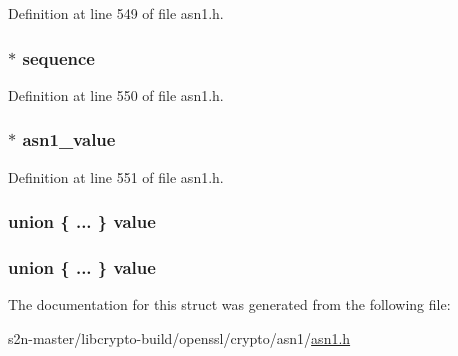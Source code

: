 Definition at line 549 of file asn1.\+h.

\subsubsection[{\texorpdfstring{sequence}{sequence}}]{$\ast$ sequence}\hypertarget{structasn1__type__st_ad6df88fe00a72b91394ae1b8b62d11ee}{}\label{structasn1__type__st_ad6df88fe00a72b91394ae1b8b62d11ee}


Definition at line 550 of file asn1.\+h.

\subsubsection[{\texorpdfstring{asn1\+\_\+value}{asn1_value}}]{$\ast$ asn1\+\_\+value}\hypertarget{structasn1__type__st_a5b16847c55935c796161c1578ae3fbf7}{}\label{structasn1__type__st_a5b16847c55935c796161c1578ae3fbf7}


Definition at line 551 of file asn1.\+h.

\subsubsection[{\texorpdfstring{value}{value}}]{\setlength{\rightskip}{0pt plus 5cm}union \{ ... \}   value}\hypertarget{structasn1__type__st_ae60c70d0684f3bdc94a3ad0ceed3ac49}{}\label{structasn1__type__st_ae60c70d0684f3bdc94a3ad0ceed3ac49}
\subsubsection[{\texorpdfstring{value}{value}}]{\setlength{\rightskip}{0pt plus 5cm}union \{ ... \}   value}\hypertarget{structasn1__type__st_af3dc6466d27cceff4e002600514915fd}{}\label{structasn1__type__st_af3dc6466d27cceff4e002600514915fd}


The documentation for this struct was generated from the following file\+:\begin{DoxyCompactItemize}
\item 
s2n-\/master/libcrypto-\/build/openssl/crypto/asn1/\hyperlink{crypto_2asn1_2asn1_8h}{asn1.\+h}\end{DoxyCompactItemize}
